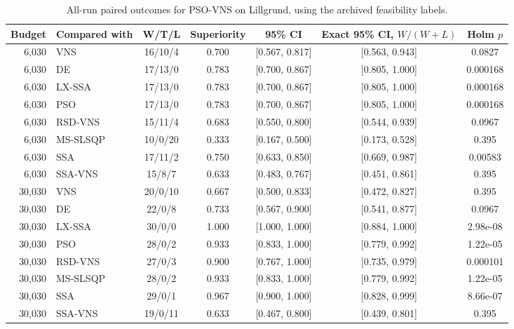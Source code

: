 \begin{table}[!htbp]
\centering
\caption{All-run paired outcomes for PSO-VNS on Lillgrund, using the archived feasibility labels.}
\label{tab:archive-paired}
\small\setlength{\tabcolsep}{4pt}
\begin{tabular}{rlccccc}
\toprule
Budget & Compared with & W/T/L & Superiority & 95\% CI & Exact 95\% CI, $W/(W+L)$ & Holm $p$ \\
\midrule
6,030 & VNS & 16/10/4 & 0.700 & [0.567, 0.817] & [0.563, 0.943] & 0.0827 \\
6,030 & DE & 17/13/0 & 0.783 & [0.700, 0.867] & [0.805, 1.000] & 0.000168 \\
6,030 & LX-SSA & 17/13/0 & 0.783 & [0.700, 0.867] & [0.805, 1.000] & 0.000168 \\
6,030 & PSO & 17/13/0 & 0.783 & [0.700, 0.867] & [0.805, 1.000] & 0.000168 \\
6,030 & RSD-VNS & 15/11/4 & 0.683 & [0.550, 0.800] & [0.544, 0.939] & 0.0967 \\
6,030 & MS-SLSQP & 10/0/20 & 0.333 & [0.167, 0.500] & [0.173, 0.528] & 0.395 \\
6,030 & SSA & 17/11/2 & 0.750 & [0.633, 0.850] & [0.669, 0.987] & 0.00583 \\
6,030 & SSA-VNS & 15/8/7 & 0.633 & [0.483, 0.767] & [0.451, 0.861] & 0.395 \\
30,030 & VNS & 20/0/10 & 0.667 & [0.500, 0.833] & [0.472, 0.827] & 0.395 \\
30,030 & DE & 22/0/8 & 0.733 & [0.567, 0.900] & [0.541, 0.877] & 0.0967 \\
30,030 & LX-SSA & 30/0/0 & 1.000 & [1.000, 1.000] & [0.884, 1.000] & 2.98e-08 \\
30,030 & PSO & 28/0/2 & 0.933 & [0.833, 1.000] & [0.779, 0.992] & 1.22e-05 \\
30,030 & RSD-VNS & 27/0/3 & 0.900 & [0.767, 1.000] & [0.735, 0.979] & 0.000101 \\
30,030 & MS-SLSQP & 28/0/2 & 0.933 & [0.833, 1.000] & [0.779, 0.992] & 1.22e-05 \\
30,030 & SSA & 29/0/1 & 0.967 & [0.900, 1.000] & [0.828, 0.999] & 8.66e-07 \\
30,030 & SSA-VNS & 19/0/11 & 0.633 & [0.467, 0.800] & [0.439, 0.801] & 0.395 \\
\bottomrule
\end{tabular}

\end{table}
